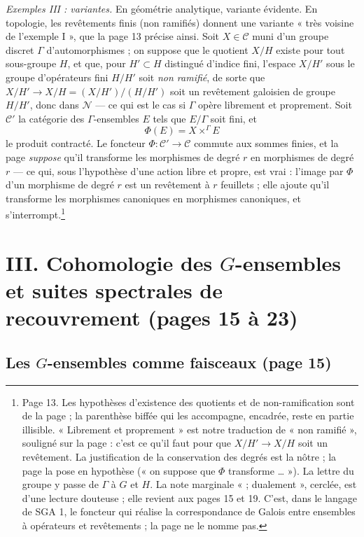 \documentclass[11pt,a4paper]{article}
\begin{document}
\emph{Exemples III : variantes.} En géométrie analytique, variante évidente.
En topologie, les revêtements finis (non ramifiés) donnent une variante
« très voisine de l'exemple I », que la page 13 précise ainsi. Soit
$X \in \mathcal{C}$ muni d'un groupe discret $\Gamma$ d'automorphismes ; on
suppose que le quotient $X/H$ existe pour tout sous-groupe $H$, et que, pour
$H' \subset H$ distingué d'indice fini, l'espace $X/H'$ sous le groupe
d'opérateurs fini $H/H'$ soit \emph{non ramifié}, de sorte que
$X/H' \to X/H = (X/H')/(H/H')$ soit un revêtement galoisien de groupe
$H/H'$, donc dans $\mathcal{N}$ --- ce qui est le cas si $\Gamma$ opère
librement et proprement. Soit $\mathcal{C}'$ la catégorie des
$\Gamma$-ensembles $E$ tels que $E/\Gamma$ soit fini, et
\[
  \Phi(E) = X \times^{\Gamma} E
\]
le produit contracté. Le foncteur $\Phi : \mathcal{C}' \to \mathcal{C}$
commute aux sommes finies, et la page \emph{suppose} qu'il transforme les
morphismes de degré $r$ en morphismes de degré $r$ --- ce qui, sous
l'hypothèse d'une action libre et propre, est vrai : l'image par $\Phi$
d'un morphisme de degré $r$ est un revêtement à $r$ feuillets ; elle
ajoute qu'il transforme les morphismes canoniques en
morphismes canoniques, et s'interrompt.\footnote{Page 13. Les hypothèses
d'existence des quotients et de non-ramification sont de la page ; la
parenthèse biffée qui les accompagne, encadrée, reste en partie illisible.
« Librement et proprement » est notre traduction de « non ramifié »,
souligné sur la page : c'est ce qu'il faut pour que $X/H' \to X/H$ soit un
revêtement. La justification de la conservation des degrés est la nôtre ;
la page la pose en hypothèse (« on suppose que $\Phi$ transforme … »).
La lettre du groupe y passe de $\Gamma$ à $G$ et $H$. La note marginale
« ; dualement », cerclée, est d'une lecture douteuse ; elle revient aux
pages 15 et 19. C'est, dans le langage de SGA 1, le foncteur qui réalise la
correspondance de Galois entre ensembles à opérateurs et revêtements ; la
page ne le nomme pas.}

\section*{III. Cohomologie des $G$-ensembles et suites spectrales de recouvrement (pages 15 à 23)}

\subsection*{Les $G$-ensembles comme faisceaux (page 15)}
\end{document}
